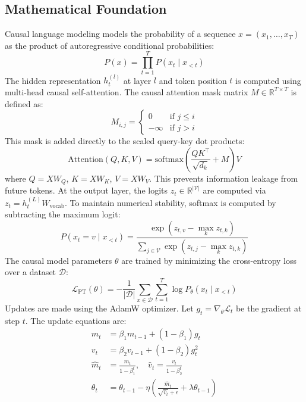 \subsection{Mathematical Foundation}
Causal language modeling models the probability of a sequence $x = (x_1, \ldots, x_T)$ as the product of autoregressive conditional probabilities:
\begin{equation}
  P(x) = \prod_{t=1}^T P(x_t \mid x_{<t})
\end{equation}
The hidden representation $h_t^{(l)}$ at layer $l$ and token position $t$ is computed using multi-head causal self-attention. The causal attention mask matrix $M \in \mathbb{R}^{T \times T}$ is defined as:
\begin{equation}
  M_{i,j} = \begin{cases} 0 & \text{if } j \le i \\ -\infty & \text{if } j > i \end{cases}
\end{equation}
This mask is added directly to the scaled query-key dot products:
\begin{equation}
  \text{Attention}(Q, K, V) = \text{softmax}\left( \frac{Q K^\top}{\sqrt{d_k}} + M \right) V
\end{equation}
where $Q = X W_Q$, $K = X W_K$, $V = X W_V$. This prevents information leakage from future tokens. At the output layer, the logits $z_t \in \mathbb{R}^{|\mathcal{V}|}$ are computed via $z_t = h_t^{(L)} W_{\text{vocab}}$. To maintain numerical stability, softmax is computed by subtracting the maximum logit:
\begin{equation}
  P(x_t = v \mid x_{<t}) = \frac{\exp(z_{t,v} - \max_k z_{t,k})}{\sum_{j \in \mathcal{V}} \exp(z_{t,j} - \max_k z_{t,k})}
\end{equation}
The causal model parameters $\theta$ are trained by minimizing the cross-entropy loss over a dataset $\mathcal{D}$:
\begin{equation}
  \mathcal{L}_{\text{PT}}(\theta) = -\frac{1}{|\mathcal{D}|}\sum_{x \in \mathcal{D}} \sum_{t=1}^T \log P_\theta(x_t \mid x_{<t})
\end{equation}
Updates are made using the AdamW optimizer. Let $g_t = \nabla_\theta \mathcal{L}_t$ be the gradient at step $t$. The update equations are:
\begin{align}
  m_t &= \beta_1 m_{t-1} + (1-\beta_1) g_t \\
  v_t &= \beta_2 v_{t-1} + (1-\beta_2) g_t^2 \\
  \hat{m}_t &= \frac{m_t}{1-\beta_1^t}, \quad \hat{v}_t = \frac{v_t}{1-\beta_2^t} \\
  \theta_t &= \theta_{t-1} - \eta \left( \frac{\hat{m}_t}{\sqrt{\hat{v}_t} + \epsilon} + \lambda \theta_{t-1} \right)
\end{align}
